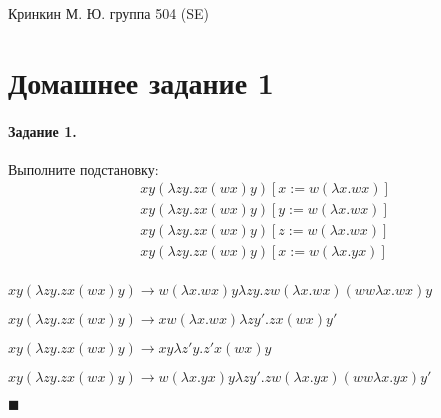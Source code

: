 \documentclass[a4paper,12pt]{article}
\begin{document}
\sloppy

\lstset{
	basicstyle=\small,
	stringstyle=\ttfamily,
	showstringspaces=false,
	columns=fixed,
	breaklines=true,
	numbers=right,
	numberstyle=\tiny
}

\newtheorem{Def}{Определение}[section]
\newtheorem{Th}{Теорема}
\newtheorem{Lem}[Th]{Лемма}
\newenvironment{Proof}
	{\par\noindent{\bf Доказательство.}}
	{\hfill$\scriptstyle\blacksquare$}
\newenvironment{Solution}
	{\par\noindent{\bf Решение.}}
	{\hfill$\scriptstyle\blacksquare$}


\begin{flushright}
	Кринкин М. Ю. группа 504 (SE)
\end{flushright}

\section{Домашнее задание 1}

\paragraph{Задание 1.} Выполните подстановку:
\[
	\begin{split}
		&xy\left(\lambda zy . zx\left(wx\right)y\right) \left[x := w\left(\lambda x . wx\right)\right]\\
		&xy\left(\lambda zy . zx\left(wx\right)y\right) \left[y := w\left(\lambda x . wx\right)\right]\\
		&xy\left(\lambda zy . zx\left(wx\right)y\right) \left[z := w\left(\lambda x . wx\right)\right]\\
		&xy\left(\lambda zy . zx\left(wx\right)y\right) \left[x := w\left(\lambda x . yx\right)\right]\\
	\end{split}
\]
\begin{Solution}

$xy\left(\lambda zy . zx\left(wx\right)y\right) \rightarrow w\left(\lambda x . wx\right)y\lambda zy . zw\left(\lambda x . wx\right)\left(ww\lambda x . wx\right)y$

$xy\left(\lambda zy . zx\left(wx\right)y\right) \rightarrow xw\left(\lambda x . wx\right)\lambda zy' . zx\left(wx\right)y'$

$xy\left(\lambda zy . zx\left(wx\right)y\right) \rightarrow xy\lambda z'y . z'x\left(wx\right)y$

$xy\left(\lambda zy . zx\left(wx\right)y\right) \rightarrow w\left(\lambda x . yx\right)y\lambda zy' . zw\left(\lambda x . yx\right)\left(ww\lambda x . yx\right)y'$

\end{Solution}
\end{document}
